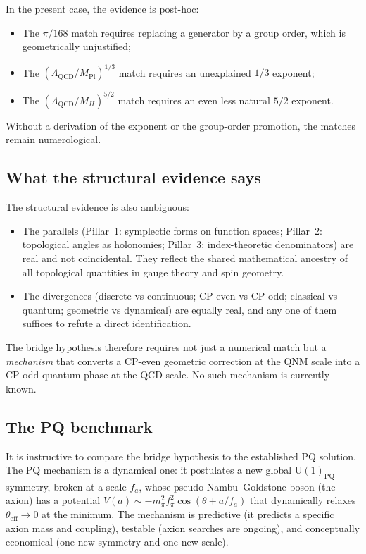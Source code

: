 \documentclass[11pt,a4paper]{article}
\newcommand{\LamQ}{\Lambda_{\mathrm{QCD}}}
\newcommand{\MP}{M_{\mathrm{Pl}}}
\theoremstyle{plain}
\theoremstyle{definition}
\theoremstyle{remark}
\begin{document}
In the present case, the evidence is post-hoc:
\begin{itemize}[leftmargin=2em,itemsep=0.1em]
  \item The $\pi/168$ match requires replacing a generator by a group
        order, which is geometrically unjustified;
  \item The $(\LamQ/\MP)^{1/3}$ match requires an unexplained $1/3$
        exponent;
  \item The $(\LamQ/M_H)^{5/2}$ match requires an even less natural
        $5/2$ exponent.
\end{itemize}
Without a derivation of the exponent or the group-order promotion, the
matches remain numerological.

\subsection{What the structural evidence says}\label{ssec:disc-structural}

The structural evidence is also ambiguous:
\begin{itemize}[leftmargin=2em,itemsep=0.1em]
  \item The parallels (Pillar~1: symplectic forms on function spaces;
        Pillar~2: topological angles as holonomies; Pillar~3:
        index-theoretic denominators) are real and not coincidental.
        They reflect the shared mathematical ancestry of all
        topological quantities in gauge theory and spin geometry.
  \item The divergences (discrete vs continuous; CP-even vs CP-odd;
        classical vs quantum; geometric vs dynamical) are equally
        real, and any one of them suffices to refute a direct
        identification.
\end{itemize}
The bridge hypothesis therefore requires not just a numerical match
but a \emph{mechanism} that converts a CP-even geometric correction at
the QNM scale into a CP-odd quantum phase at the QCD scale.  No such
mechanism is currently known.

\subsection{The PQ benchmark}\label{ssec:disc-pq}

It is instructive to compare the bridge hypothesis to the established
PQ solution.  The PQ mechanism is a dynamical one: it postulates a new
global $\mathrm{U}(1)_{\mathrm{PQ}}$ symmetry, broken at a scale
$f_a$, whose pseudo-Nambu--Goldstone boson (the axion) has a potential
$V(a)\sim -m_\pi^2 f_\pi^2 \cos(\theta + a/f_a)$ that dynamically
relaxes $\theta_{\mathrm{eff}}\to 0$ at the minimum.  The mechanism is
predictive (it predicts a specific axion mass and coupling), testable
(axion searches are ongoing), and conceptually economical (one new
symmetry and one new scale).
\end{document}
